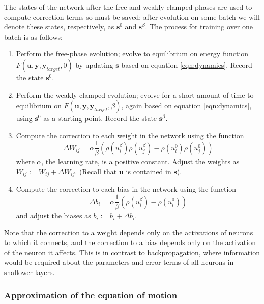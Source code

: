 \documentclass{article}
\newcommand{\mtx}[1]{\bm{#1}}
\begin{document}
The states of the network after the free and weakly-clamped phases are used to compute correction terms so must be saved; after evolution on some batch we will denote these states, respectively, as $\mtx{s}^0$ and $\mtx{s}^{\beta}$. The process for training over one batch is as follows:
\begin{enumerate}
\item Perform the free-phase evolution; evolve to equilibrium on energy function $F(\mtx{u}, \mtx{y}, \mtx{y}_{target}, 0)$ by updating $\mtx{s}$ based on equation \ref{eqn:dynamics}. Record the state $\mtx{s}^0$.
\item Perform the weakly-clamped evolution; evolve for a short amount of time to equilibrium on $F(\mtx{u},\mtx{y},\mtx{y}_{target},\beta)$, again based on equation \ref{eqn:dynamics}, using $\mtx{s}^0$ as a starting point. Record the state $\mtx{s}^{\beta}$.
\item Compute the correction to each weight in the network using the function 
\begin{equation}
\Delta W_{ij}=\alpha \frac{1}{\beta}(\rho(u_i^\beta)\rho(u_j^\beta)-\rho(u_i^0)\rho(u_j^0))
\end{equation}
where $\alpha$, the learning rate, is a positive constant. Adjust the weights as $W_{ij}:=W_{ij}+\Delta W_{ij}$. (Recall that $\mtx{u}$ is contained in $\mtx{s}$).
\item Compute the correction to each bias in the network using the function
\begin{equation}
\Delta b_i=\alpha \frac{1}{\beta}(\rho(u_i^{\beta})-\rho(u_i^0))
\end{equation}
and adjust the biases as $b_i:=b_i+\Delta b_i$.
\end{enumerate}
Note that the correction to a weight depends only on the activations of neurons to which it connects, and the correction to a bias depends only on the activation of the neuron it affects. This is in contrast to backpropagation, where information would be required about the parameters and error terms of all neurons in shallower layers.

\subsubsection{Approximation of the equation of motion}
\end{document}
